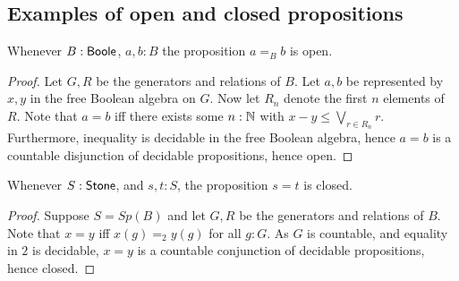 \subsection{Examples of open and closed propositions}
\begin{lemma}\label{BooleEqualityOpen}
  Whenever $B:\mathsf{Boole}$, $a,b:B$ the proposition $a=_Bb$ is open. 
\end{lemma}
\begin{proof}
  Let $G,R$ be the generators and relations of $B$. 
  Let $a,b$ be represented by $x,y$ in the free Boolean algebra on $G$. 
  Now let $R_n$ denote the first $n$ elements of $R$. 
  Note that $a=b$ iff there exists some $n:\mathbb{N}$ with 
  $x-y \leq \bigvee_{r\in R_n} r$. 
  Furthermore, inequality is decidable in the free Boolean algebra, hence
  $a=b$ is a countable disjunction of decidable propositions, hence open. 
\end{proof}


\begin{corollary}\label{StoneEqualityClosed}
  Whenever $S:\mathsf{Stone}$, and $s,t:S$, the proposition $s=t$ is closed. 
\end{corollary}
\begin{proof}
  Suppose $S= Sp(B)$ and let $G,R$ be the generators and relations of $B$. 
  Note that $x=y$ iff $x(g) =_2 y(g)$ for all $g:G$. 
  As $G$ is countable, and equality in $2$ is decidable, 
  $x=y$ is a countable conjunction of decidable propositions, hence closed. 
\end{proof}

